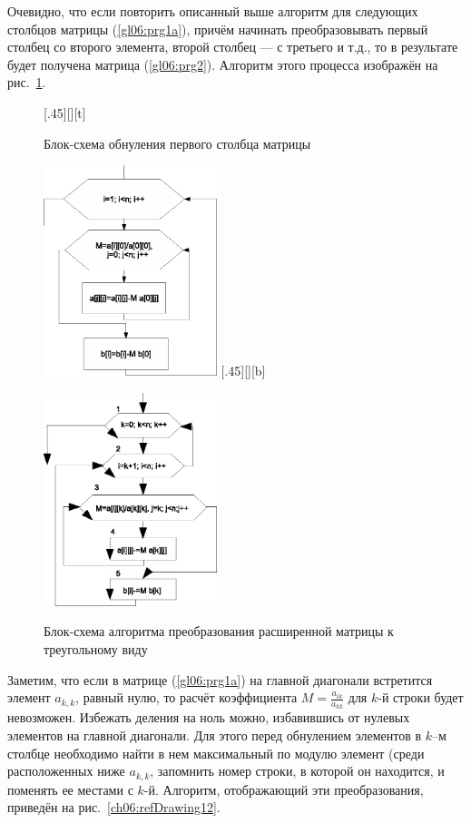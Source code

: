 Очевидно, что если повторить описанный выше алгоритм для следующих столбцов матрицы (\ref{gl06:prg1a}), причём начинать
преобразовывать первый столбец со второго элемента, второй столбец --- с третьего и т.д., то в результате будет получена
матрица (\ref{gl06:prg2}). Алгоритм этого процесса изображён на рис.~\ref{ch06:refDrawing11}.
{\small
\begin{figure}[H]
\begin{floatrow}
[.45\textwidth][\FBheight][t]
{\caption{Блок-схема обнуления первого столбца матрицы}
\label{ch06:refDrawing10}}
{\includegraphics[width=0.45\textwidth,keepaspectratio]{img/ris_6_11}}\hspace*{0.05\textwidth}
%
[.45\textwidth][\FBheight][b]
{\caption{Блок-схема алгоритма преобразования расширенной матрицы к треугольному виду}
\label{ch06:refDrawing11}}
{\includegraphics[width=0.45\textwidth,keepaspectratio]{img/ris_6_12}}
\end{floatrow}
\end{figure}
}

Заметим, что если в матрице (\ref{gl06:prg1a}) на главной диагонали встретится элемент  $a_{k,k}$, равный нулю, то
расчёт коэффициента $M=\frac{a_{ik}}{a_{kk}}$  для $k$-й строки будет невозможен. Избежать деления на
ноль можно, избавившись от нулевых элементов на главной диагонали. Для этого перед обнулением элементов в $k$–м столбце
необходимо найти в нем максимальный по модулю элемент (среди расположенных ниже  $a_{k,k}$, запомнить номер строки, в
которой он находится, и поменять ее местами с $k$-й. Алгоритм, отображающий эти преобразования, приведён 
на рис.~\ref{ch06:refDrawing12}.

